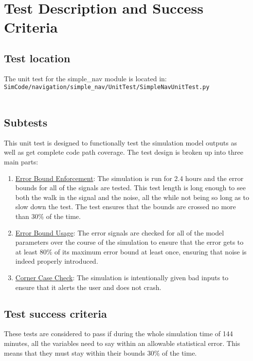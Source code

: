 \section{Test Description and Success Criteria}


\subsection{Test location}

The unit test for the simple\_nav module is located in:\\

\noindent
{\tt SimCode/navigation/simple\_nav/UnitTest/SimpleNavUnitTest.py} \\
\\

\subsection{Subtests}

\noindent This unit test is designed to functionally test the simulation model 
outputs as well as get complete code path coverage.  The test design is broken 
up into three main parts:\\
\begin{enumerate}
\item{\underline{Error Bound Enforcement}: The simulation is run for 2.4 hours and the 
   error bounds for all of the signals are tested. This test length is long enough to see both
   the walk in the signal and the noise, all the while not being so long as to slow down the test.
   The test ensures that the bounds are crossed no more than 30\% of the time.}
\item{\underline{Error Bound Usage}: The error signals are checked for all of the model 
   parameters over the course of the simulation to ensure that the error gets 
   to at least 80\% of its maximum error bound at least once, ensuring that noise is indeed
   properly introduced.}
\item{\underline{Corner Case Check}: The simulation is intentionally given bad inputs to 
   ensure that it alerts the user and does not crash.}
\end{enumerate}

\subsection{Test success criteria}

These tests are considered to pass if during the whole simulation time of 144 minutes,
all the variables need to say within an allowable statistical error. This means that they
must stay within their bounds $30\%$ of the time.

